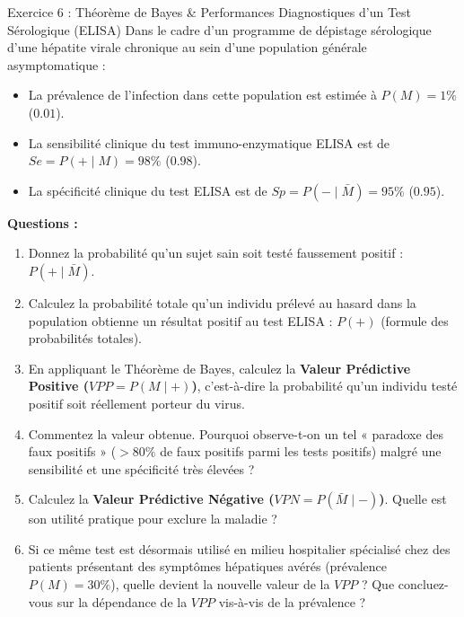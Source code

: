 \documentclass[11pt,a4paper]{article}
\begin{document}
\begin{exercicebox}{Exercice 6 : Théorème de Bayes \& Performances Diagnostiques d'un Test Sérologique (ELISA)}
Dans le cadre d'un programme de dépistage sérologique d'une hépatite virale chronique au sein d'une population générale asymptomatique :
\begin{itemize}
  \item La prévalence de l'infection dans cette population est estimée à $P(M) = 1\%$ ($0.01$).
  \item La sensibilité clinique du test immuno-enzymatique ELISA est de $Se = P(+ \mid M) = 98\%$ ($0.98$).
  \item La spécificité clinique du test ELISA est de $Sp = P(- \mid \bar{M}) = 95\%$ ($0.95$).
\end{itemize}

\textbf{Questions :}
\begin{enumerate}[label=\textbf{\alph*.}]
  \item Donnez la probabilité qu'un sujet sain soit testé faussement positif : $P(+ \mid \bar{M})$.
  \item Calculez la probabilité totale qu'un individu prélevé au hasard dans la population obtienne un résultat positif au test ELISA : $P(+)$ (formule des probabilités totales).
  \item En appliquant le Théorème de Bayes, calculez la \textbf{Valeur Prédictive Positive ($VPP = P(M \mid +)$)}, c'est-à-dire la probabilité qu'un individu testé positif soit réellement porteur du virus.
  \item Commentez la valeur obtenue. Pourquoi observe-t-on un tel « paradoxe des faux positifs » ($> 80\%$ de faux positifs parmi les tests positifs) malgré une sensibilité et une spécificité très élevées ?
  \item Calculez la \textbf{Valeur Prédictive Négative ($VPN = P(\bar{M} \mid -)$)}. Quelle est son utilité pratique pour exclure la maladie ?
  \item Si ce même test est désormais utilisé en milieu hospitalier spécialisé chez des patients présentant des symptômes hépatiques avérés (prévalence $P(M) = 30\%$), quelle devient la nouvelle valeur de la $VPP$ ? Que concluez-vous sur la dépendance de la $VPP$ vis-à-vis de la prévalence ?
\end{enumerate}
\end{exercicebox}
\end{document}
